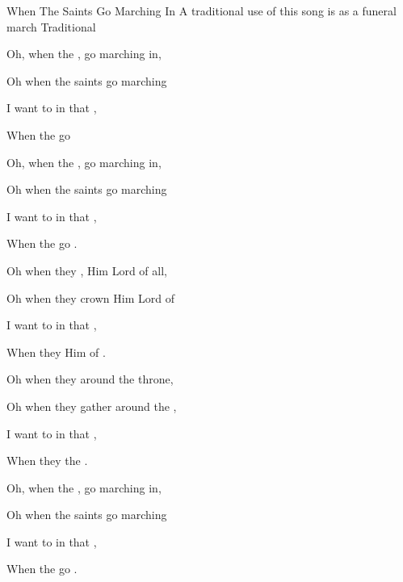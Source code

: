 \begin{SBSong}{When The Saints Go Marching In}
  {A traditional use of this song is as a funeral march}
  {Traditional}
  \begin{SBVerse}
    Oh, when the , go marching in,
    
    Oh when the saints go marching 
    
    I want to  in that ,
    
    When the  go   
  \end{SBVerse}
  \begin{SBVerse}
    Oh, when the , go marching in,
    
    Oh when the saints go marching 
    
    I want to  in that ,
    
    When the  go  . 
  \end{SBVerse}
  \begin{SBVerse}
    Oh when they , Him Lord of all,
    
    Oh when they crown Him Lord of  
    
    I want to  in that ,
    
    When they  Him  of . 
  \end{SBVerse}
  \begin{SBVerse}
    Oh when they  around the throne,
    
    Oh when they gather around the ,
    
    I want to  in that ,
    
    When they   the . 
  \end{SBVerse}
  
  \begin{SBVerse}
    Oh, when the , go marching in,
    
    Oh when the saints go marching 
    
    I want to  in that ,
    
    When the  go  . 
  \end{SBVerse}
\end{SBSong}
